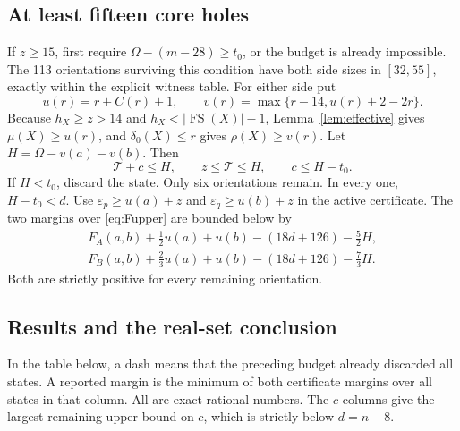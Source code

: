 \documentclass[11pt,a4paper]{article}
\newcommand{\FS}{\operatorname{FS}}
\newcommand{\T}{\mathcal T}
\begin{document}
\subsection{At least fifteen core holes}
If $z\ge15$, first require $\Omega-(m-28)\ge t_0$, or the budget is
already impossible. The 113 orientations surviving this condition have
both side sizes in $[32,55]$, exactly within the explicit witness table.
For either side put
\[
 u(r)=r+C(r)+1,\qquad v(r)=\max\{r-14,u(r)+2-2r\}.
\]
Because $h_X\ge z>14$ and $h_X<|\FS(X)|-1$, Lemma~\ref{lem:effective}
gives $\mu(X)\ge u(r)$, and $\delta_0(X)\le r$ gives $\rho(X)\ge v(r)$.
Let $H=\Omega-v(a)-v(b)$. Then
\[
 \T+c\le H,\qquad z\le\T\le H,\qquad c\le H-t_0.
\]
If $H<t_0$, discard the state. Only six orientations remain. In every
one, $H-t_0<d$. Use $\varepsilon_p\ge u(a)+z$ and
$\varepsilon_q\ge u(b)+z$ in the active certificate. The two margins over
\eqref{eq:Fupper} are bounded below by
\begin{align*}
 F_A(a,b)+\tfrac12u(a)+u(b)-(18d+126)-\tfrac52H,\\
 F_B(a,b)+\tfrac23u(a)+u(b)-(18d+126)-\tfrac73H.
\end{align*}
Both are strictly positive for every remaining orientation.

\subsection{Results and the real-set conclusion}
In the table below, a dash means that the preceding budget already
discarded all states. A reported margin is the minimum of both
certificate margins over all states in that column. All are exact
rational numbers. The $c$ columns give the largest remaining upper bound
on $c$, which is strictly below $d=n-8$.
\end{document}
